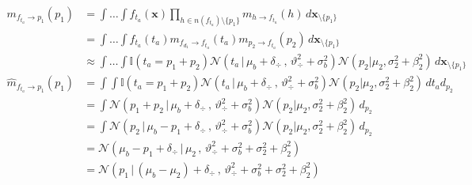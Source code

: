 \documentclass[11pt,twoside,spanish]{report} %
\begin{document}
\begin{equation}\label{eq:^m_fta_p}
	\begin{split}
		m_{f_{t_a} \rightarrow p_1}(p_1) &= \int \dots \int f_{t_a}(\textbf{x}) \prod_{h \in n(f_{t_a}) \setminus \{p_1\} } m_{h \rightarrow f_{t_a}}(h) \, d\textbf{x}_{\setminus \{p_1\} }  \\
		&= \int \dots \int f_{t_a}(t_a)  m_{f_{d_1} \rightarrow f_{t_a}}(t_a) m_{p_2 \rightarrow f_{t_a}}(p_2)\, d\textbf{x}_{\setminus \{p_1\} }  \\
		&\approx  \int \dots \int \mathbb{I}(t_a = p_1 + p_2) \mathcal{N}(t_a \, | \, \mu_b + \delta_{\div} \, , \, \vartheta_{\div}^2 + \sigma_b^2) \mathcal{N}(p_2 | \mu_2 , \sigma_2^2 + \beta_2^2)  \, d\textbf{x}_{\setminus \{p_1\} } \\[0.1cm]
		\widehat{m}_{f_{t_a} \rightarrow p_1}(p_1)  & =\int \int \mathbb{I}(t_a = p_1 + p_2) \mathcal{N}(t_a \, | \, \mu_b + \delta_{\div} \, , \, \vartheta_{\div}^2 + \sigma_b^2) \mathcal{N}(p_2 | \mu_2 , \sigma_2^2 + \beta_2^2)  \, d{t_a} d_{p_2} \\
		& =\int \mathcal{N}(p_1 + p_2 \, | \, \mu_b + \delta_{\div} \, , \, \vartheta_{\div}^2 + \sigma_b^2) \mathcal{N}(p_2 | \mu_2 , \sigma_2^2+ \beta_2^2 )   \, d_{p_2} \\
		& =\int \mathcal{N}(p_2 \, | \, \mu_b - p_1 + \delta_{\div} \, , \, \vartheta_{\div}^2 + \sigma_b^2) \mathcal{N}(p_2 | \mu_2 , \sigma_2^2 + \beta_2^2)   \, d_{p_2} \\
		& = \mathcal{N}(\mu_b - p_1 + \delta_{\div} \,|\, \mu_2 \,,\,\vartheta_{\div}^2 + \sigma_b^2 + \sigma_2^2 + \beta_2^2)   \\
		&=  \mathcal{N}( p_1 \,|\,  (\mu_b - \mu_2) + \delta_{\div}  \,,\,\vartheta_{\div}^2 + \sigma_b^2 + \sigma_2^2 + \beta_2^2)  \\
	\end{split}
\end{equation}
\end{document}
